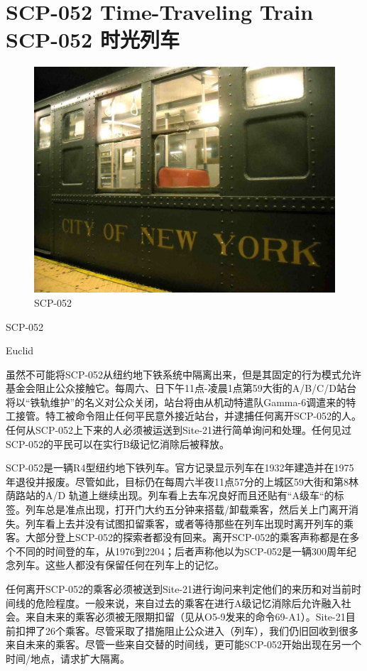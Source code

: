 \chapter[SCP-052 时光列车]{
    SCP-052 Time-Traveling Train\\
    SCP-052 时光列车
}

\label{chap:SCP-052}

\begin{figure}[H]
    \centering
    \includegraphics[width=0.5\linewidth]{images/SCP-052.jpg}
    \caption*{SCP-052}
\end{figure}

SCP-052

Euclid

虽然不可能将SCP-052从纽约地下铁系统中隔离出来，但是其固定的行为模式允许基金会阻止公众接触它。每周六、日下午11点-凌晨1点第59大街的A\slash B\slash C\slash D站台将以“铁轨维护”的名义对公众关闭，站台将由从机动特遣队Gamma-6调遣来的特工接管。特工被命令阻止任何平民意外接近站台，并逮捕任何离开SCP-052的人。任何从SCP-052上下来的人必须被运送到Site-21进行简单询问和处理。任何见过SCP-052的平民可以在实行B级记忆消除后被释放。

SCP-052是一辆R4型纽约地下铁列车。官方记录显示列车在1932年建造并在1975年退役并报废。尽管如此，目标仍在每周六半夜11点57分的上城区59大街和第8林荫路站的A\slash D 轨道上继续出现。列车看上去车况良好而且还贴有“A级车“的标签。列车总是准点出现，打开门大约五分钟来搭载\slash 卸载乘客，然后关上门离开消失。列车看上去并没有试图扣留乘客，或者等待那些在列车出现时离开列车的乘客。大部分登上SCP-052的探索者都没有回来。离开SCP-052的乘客声称都是在多个不同的时间登的车，从1976到2204；后者声称他以为SCP-052是一辆300周年纪念列车。这些人都没有保留任何在列车上的记忆。

任何离开SCP-052的乘客必须被送到Site-21进行询问来判定他们的来历和对当前时间线的危险程度。一般来说，来自过去的乘客在进行A级记忆消除后允许融入社会。来自未来的乘客必须被无限期扣留（见从O5-9发来的命令69-A1）。Site-21目前扣押了26个乘客。尽管采取了措施阻止公众进入（列车），我们仍旧回收到很多来自未来的乘客。尽管一些来自交替的时间线，更可能SCP-052开始出现在另一个时间\slash 地点，请求扩大隔离。

